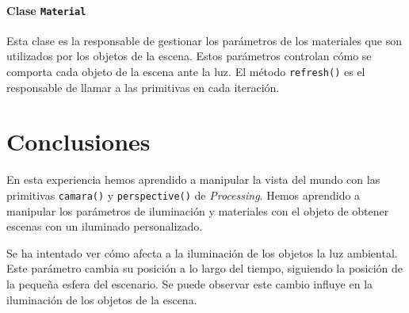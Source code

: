 \documentclass[10pt,a4paper]{report}
\begin{document}
	\subsubsection{Clase \texttt{Material}}
	Esta clase es la responsable de gestionar los parámetros de los materiales que son utilizados por los objetos de la escena. Estos parámetros controlan cómo se comporta cada objeto de la escena ante la luz. El método \texttt{refresh()} es el responsable de llamar a las primitivas en cada iteración.
	
	
	
	
	\chapter{Conclusiones}	
	En esta experiencia hemos aprendido a manipular la vista del mundo con las primitivas \texttt{camara()} y \texttt{perspective()} de \textit{Processing}. Hemos aprendido a manipular los parámetros de iluminación y materiales con el objeto de obtener escenas con un iluminado personalizado.
	
	Se ha intentado ver cómo afecta a la iluminación de los objetos la luz ambiental. Este parámetro cambia su posición a lo largo del tiempo, siguiendo la posición de la pequeña esfera del escenario. Se puede observar este cambio influye en la iluminación de los objetos de la escena.
	
	
\end{document}
